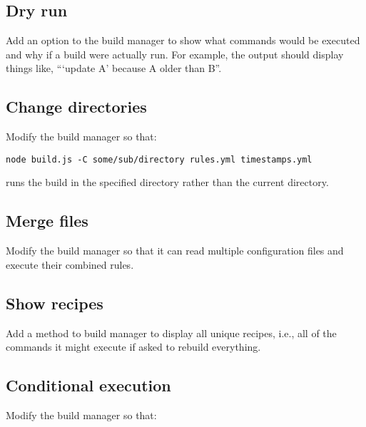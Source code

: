 \documentclass[krantzl]{krantz}
\begin{document}
\subsection*{Dry run}


Add an option to the build manager to show what commands would be executed and why
if a build were actually run.
For example,
the output should display things like, “‘update A’ because A older than B”.

\subsection*{Change directories}


Modify the build manager so that:

\begin{lstlisting}[frame=tblr]
node build.js -C some/sub/directory rules.yml timestamps.yml
\end{lstlisting}


\noindent runs the build in the specified directory rather than the current directory.

\subsection*{Merge files}


Modify the build manager so that it can read multiple configuration files
and execute their combined rules.

\subsection*{Show recipes}


Add a method to build manager to display all unique recipes,
i.e.,
all of the commands it might execute if asked to rebuild everything.

\subsection*{Conditional execution}


Modify the build manager so that:
\end{document}
